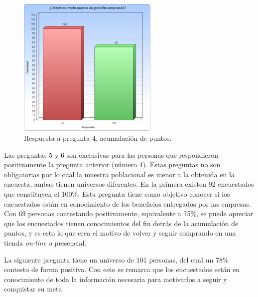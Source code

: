 \begin{figure}[!htb]
    \centering
    \includegraphics[width=0.6\textwidth]{images/Graficos/graf_5_2.png}
    \caption[chart5.2]{Respuesta a pregunta 4, acumulación de puntos.}
    \label{fig:chart5.2}
\end{figure}


Las preguntas 5 y 6 son exclusivas para las personas que respondieron positivamente
la pregunta anterior (número 4).
Estas preguntas no son obligatorias por lo cual la muestra poblacional
es menor a la obtenida en la encuesta, ambas tienen universos diferentes.
En la primera existen 92 encuestados que constituyen el 100\%.
Esta pregunta tiene como objetivo conocer si los encuestados están en conocimiento
de los beneficios entregados por las empresas.
Con 69 personas contestando positivamente, equivalente a 75\%, se puede apreciar
que los encuestados tienen conocimientos del fin detrás de la acumulación de puntos,
y es esto lo que crea el motivo de volver y seguir comprando en una tienda
\emph{on-line} o presencial.

La siguiente pregunta tiene un universo de 101 personas,
del cual un 78\% contesto de forma positiva.
Con esto se remarca que los encuestados están en conocimiento de toda la
información necesaria para motivarlos a seguir y conquistar su meta.

